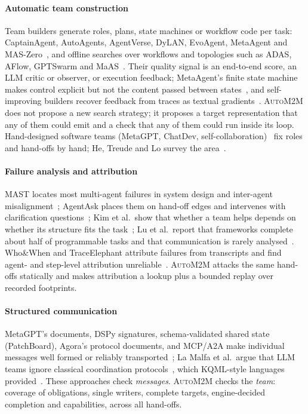 \documentclass[10pt,conference]{IEEEtran}
\theoremstyle{definition}
\newcommand{\auto}{\textsc{AutoM2M}}
\begin{document}
\paragraph*{Automatic team construction} Team builders generate roles, plans,
state machines or workflow code per task:
CaptainAgent, AutoAgents, AgentVerse, DyLAN, EvoAgent, MetaAgent and
MAS-Zero~\cite{song2024captain,chen2024autoagents,chen2024agentverse,liu2024dylan,yuan2025evoagent,zhang2025metaagent,ke2025maszero},
and offline searches over workflows and topologies such as ADAS, AFlow,
GPTSwarm and MaAS~\cite{hu2025adas,zhang2025aflow,zhuge2024gptswarm,zhang2025maas}.
Their quality signal is an end-to-end score, an LLM critic or observer, or
execution feedback; MetaAgent's finite state machine makes control explicit
but not the content passed between states~\cite{zhang2025metaagent}, and
self-improving builders recover feedback from traces as textual
gradients~\cite{he2026tpgo}. \auto{} does not propose a new search
strategy; it proposes a target representation that any of them could emit
and a check that any of them could run inside its loop. Hand-designed
software teams (MetaGPT, ChatDev, self-collaboration)~\cite{hong2024metagpt,qian2024chatdev,dong2024selfcollab}
fix roles and hand-offs by hand; He, Treude and Lo survey the
area~\cite{he2025lma}.

\paragraph*{Failure analysis and attribution} MAST locates most multi-agent
failures in system design and inter-agent misalignment~\cite{cemri2025mast};
AgentAsk places them on hand-off edges and intervenes with clarification
questions~\cite{lin2026agentask}; Kim et al.\ show that whether a team helps
depends on whether its structure fits the task~\cite{kim2025scaling}; Lu et
al.\ report that frameworks complete about half of programmable tasks and
that communication is rarely analysed~\cite{lu2025exploring}. Who\&When and
TraceElephant attribute failures from transcripts and find agent- and
step-level attribution
unreliable~\cite{zhang2025whowhen,chen2026traceelephant}. \auto{} attacks the
same hand-offs statically and makes attribution a lookup plus a bounded
replay over recorded footprints.

\paragraph*{Structured communication} MetaGPT's documents, DSPy signatures,
schema-validated shared state (PatchBoard), Agora's protocol documents, and
MCP/A2A make individual messages well formed or reliably
transported~\cite{hong2024metagpt,khattab2024dspy,zhang2026patchboard,marro2024agora,mcp2024,a2a2025};
La Malfa et al.\ argue that LLM teams ignore classical coordination
protocols~\cite{lamalfa2025miss}, which KQML-style languages
provided~\cite{finin1994kqml}. These approaches check \emph{messages}.
\auto{} checks the \emph{team}: coverage of obligations, single writers,
complete targets, engine-decided completion and capabilities, across all
hand-offs.
\end{document}
